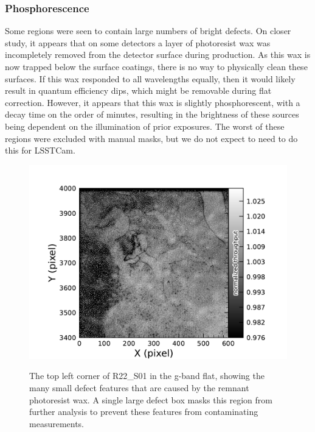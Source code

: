 \subsubsection{Phosphorescence}
Some regions were seen to contain large numbers of bright defects.
On closer study, it appears that on some detectors a layer of photoresist wax was incompletely removed from the detector surface during production.
As this wax is now trapped below the surface coatings, there is no way to physically clean these surfaces.
If this wax responded to all wavelengths equally, then it would likely result in quantum efficiency dips, which might be removable during flat correction.
However, it appears that this wax is slightly phosphorescent, with a decay time on the order of minutes, resulting in the brightness of these sources being dependent on the illumination of prior exposures.
The worst of these regions were excluded with manual masks, but we do not expect to need to do this for LSSTCam.
\begin{figure}[htb!]
  \centering
  \includegraphics[width=0.98\linewidth]{figures/dp1_isr_anomalies-phosphorescence.pdf}
  \label{fig:anomalies_phosphorescence}
  \caption{
    The top left corner of R22\_S01 in the g-band flat, showing the many small defect features that are caused by the remnant photoresist wax.
    A single large defect box masks this region from further analysis to prevent these features from contaminating measurements.
  }
\end{figure}

